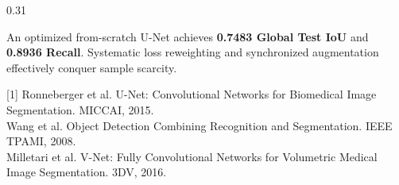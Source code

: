 \documentclass[final]{beamer}
\begin{document}
\begin{frame}[t]
\begin{columns}[t]
\begin{column}{0.31\textwidth}
        \vspace{0.4cm}

        \begin{tcolorbox}[colback=white, colframe=headerblue, title={\Large\bfseries Conclusion}, arc=2mm, boxrule=0.8mm]
        {\large An optimized from-scratch U-Net achieves \textbf{0.7483 Global Test IoU} and \textbf{0.8936 Recall}. Systematic loss reweighting and synchronized augmentation effectively conquer sample scarcity.}
        \end{tcolorbox}

        \vspace{0.2cm}

        \begin{tcolorbox}[colback=white, colframe=headerblue, title={\small\bfseries Key References}, arc=1mm, boxrule=0.5mm]
        {\tiny
        [1] Ronneberger et al. U-Net: Convolutional Networks for Biomedical Image Segmentation. MICCAI, 2015.\\
        [2] Wang et al. Object Detection Combining Recognition and Segmentation. IEEE TPAMI, 2008.\\
        [3] Milletari et al. V-Net: Fully Convolutional Networks for Volumetric Medical Image Segmentation. 3DV, 2016.}
        \end{tcolorbox}

    \end{column}

\end{columns}

\end{frame}
\end{document}
